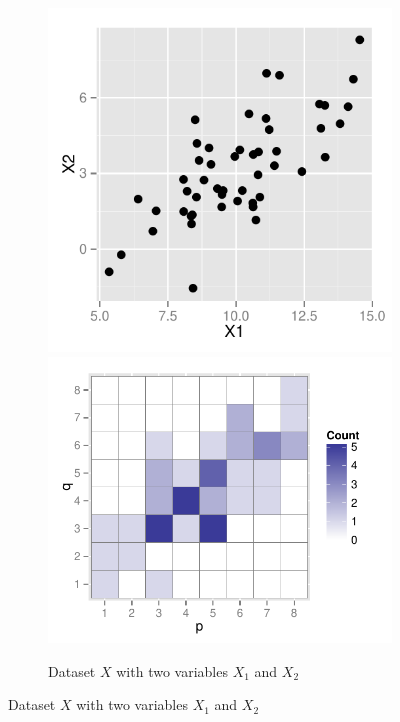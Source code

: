 \documentclass[12pt]{article}\usepackage[]{graphicx}\usepackage[]{color}
\begin{document}
\begin{figure}[!t]
\centering
\begin{subfigure}[t]{\textwidth}
\caption{Dataset $X$ with two variables $X_1$ and $X_2$ \label{type_1}}
\includegraphics[scale=0.55]{dat-example-1.pdf}
\includegraphics[scale=0.55]{bin-example-1.pdf}

\end{subfigure}
\end{figure}
\end{document}
